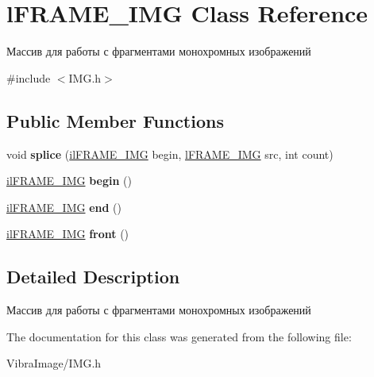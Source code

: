 \hypertarget{classl_f_r_a_m_e___i_m_g}{\section{l\+F\+R\+A\+M\+E\+\_\+\+I\+M\+G Class Reference}
\label{classl_f_r_a_m_e___i_m_g}
}


Массив для работы с фрагментами монохромных изображений  




{\ttfamily \#include $<$I\+M\+G.\+h$>$}

\subsection*{Public Member Functions}
\begin{DoxyCompactItemize}
\item 
\hypertarget{classl_f_r_a_m_e___i_m_g_ab0e5ea35090c4881e4ea340b7ac375f9}{void {\bfseries splice} (\hyperlink{classil_f_r_a_m_e___i_m_g}{il\+F\+R\+A\+M\+E\+\_\+\+I\+M\+G} begin, \hyperlink{classl_f_r_a_m_e___i_m_g}{l\+F\+R\+A\+M\+E\+\_\+\+I\+M\+G} src, int count)}\label{classl_f_r_a_m_e___i_m_g_ab0e5ea35090c4881e4ea340b7ac375f9}

\item 
\hypertarget{classl_f_r_a_m_e___i_m_g_a5abef19d65c8d89a0d0c6a4097071812}{\hyperlink{classil_f_r_a_m_e___i_m_g}{il\+F\+R\+A\+M\+E\+\_\+\+I\+M\+G} {\bfseries begin} ()}\label{classl_f_r_a_m_e___i_m_g_a5abef19d65c8d89a0d0c6a4097071812}

\item 
\hypertarget{classl_f_r_a_m_e___i_m_g_a590662ba51249b34f654e737e37e97e1}{\hyperlink{classil_f_r_a_m_e___i_m_g}{il\+F\+R\+A\+M\+E\+\_\+\+I\+M\+G} {\bfseries end} ()}\label{classl_f_r_a_m_e___i_m_g_a590662ba51249b34f654e737e37e97e1}

\item 
\hypertarget{classl_f_r_a_m_e___i_m_g_ab908144dddb8f9d5c0d1897a8d369cdb}{\hyperlink{classil_f_r_a_m_e___i_m_g}{il\+F\+R\+A\+M\+E\+\_\+\+I\+M\+G} {\bfseries front} ()}\label{classl_f_r_a_m_e___i_m_g_ab908144dddb8f9d5c0d1897a8d369cdb}

\end{DoxyCompactItemize}


\subsection{Detailed Description}
Массив для работы с фрагментами монохромных изображений 



The documentation for this class was generated from the following file\+:\begin{DoxyCompactItemize}
\item 
Vibra\+Image/I\+M\+G.\+h\end{DoxyCompactItemize}
